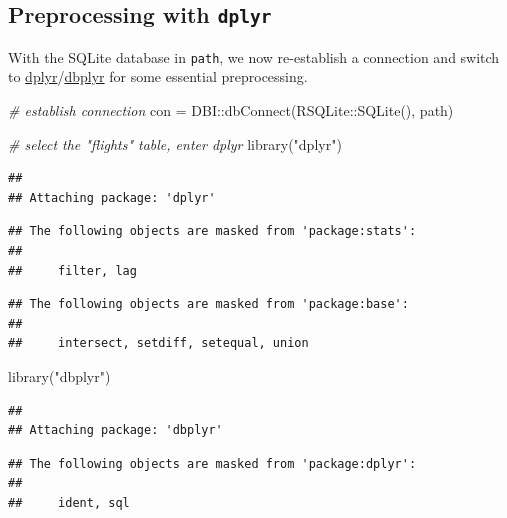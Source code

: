 \documentclass[
]{scrbook}
\newenvironment{Shaded}{\begin{snugshade}}{\end{snugshade}}
\newcommand{\CommentTok}[1]{\textcolor[rgb]{0.56,0.35,0.01}{\textit{#1}}}
\newcommand{\FunctionTok}[1]{\textcolor[rgb]{0.00,0.00,0.00}{#1}}
\newcommand{\NormalTok}[1]{#1}
\newcommand{\OtherTok}[1]{\textcolor[rgb]{0.56,0.35,0.01}{#1}}
\newcommand{\SpecialCharTok}[1]{\textcolor[rgb]{0.00,0.00,0.00}{#1}}
\newcommand{\StringTok}[1]{\textcolor[rgb]{0.31,0.60,0.02}{#1}}
\renewenvironment{Shaded} {\begin{snugshade}\small} {\end{snugshade}}
\begin{document}
\hypertarget{preprocessing-with-dplyr}{%
\subsection{\texorpdfstring{Preprocessing with \texttt{dplyr}}{Preprocessing with dplyr}}\label{preprocessing-with-dplyr}}

With the SQLite database in \texttt{path}, we now re-establish a connection and switch to \href{https://cran.r-project.org/package=dplyr}{dplyr}/\href{https://cran.r-project.org/package=dbplyr}{dbplyr} for some essential preprocessing.

\begin{Shaded}
\begin{Highlighting}[]
\CommentTok{\# establish connection}
\NormalTok{con }\OtherTok{=}\NormalTok{ DBI}\SpecialCharTok{::}\FunctionTok{dbConnect}\NormalTok{(RSQLite}\SpecialCharTok{::}\FunctionTok{SQLite}\NormalTok{(), path)}

\CommentTok{\# select the "flights" table, enter dplyr}
\FunctionTok{library}\NormalTok{(}\StringTok{"dplyr"}\NormalTok{)}
\end{Highlighting}
\end{Shaded}

\begin{verbatim}
## 
## Attaching package: 'dplyr'
\end{verbatim}

\begin{verbatim}
## The following objects are masked from 'package:stats':
## 
##     filter, lag
\end{verbatim}

\begin{verbatim}
## The following objects are masked from 'package:base':
## 
##     intersect, setdiff, setequal, union
\end{verbatim}

\begin{Shaded}
\begin{Highlighting}[]
\FunctionTok{library}\NormalTok{(}\StringTok{"dbplyr"}\NormalTok{)}
\end{Highlighting}
\end{Shaded}

\begin{verbatim}
## 
## Attaching package: 'dbplyr'
\end{verbatim}

\begin{verbatim}
## The following objects are masked from 'package:dplyr':
## 
##     ident, sql
\end{verbatim}
\end{document}

